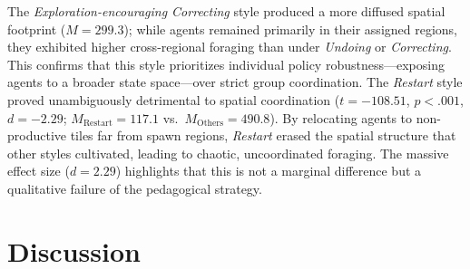 \documentclass[10pt,letterpaper]{article}
\begin{document}
 The \textit{Exploration-encouraging Correcting} style produced a more diffused spatial footprint ($M = 299.3$); while agents remained primarily in their assigned regions, they exhibited higher cross-regional foraging than under \textit{Undoing} or \textit{Correcting}. This confirms that this style prioritizes individual policy robustness---exposing agents to a broader state space---over strict group coordination.                                        
 The \textit{Restart} style proved unambiguously detrimental to spatial coordination ($t = -108.51$, $p < .001$, $d = -2.29$; $M_{\text{Restart}} = 117.1$  vs.\ $M_{\text{Others}} = 490.8$). By relocating agents to non-productive tiles far from spawn regions, \textit{Restart} erased the spatial structure that other styles cultivated, leading to chaotic, uncoordinated foraging. The massive effect size ($d = 2.29$) highlights that this is not a marginal difference but a qualitative failure of the pedagogical strategy. 


\section{Discussion}
\end{document}
